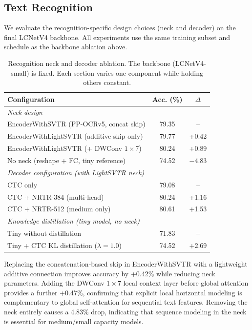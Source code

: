 \documentclass[11pt, a4paper,logo,  copyright, nonumbering]{paddleocr}
\begin{document}
\subsection{Text Recognition}
\label{sec:ablation}

We evaluate the recognition-specific design choices (neck and decoder) on the final LCNetV4 backbone. All experiments use the same training subset and schedule as the backbone ablation above.

\begin{table}[h]
\centering
\small
\begin{tabular}{lcc}
\toprule
\textbf{Configuration} & \textbf{Acc. (\%)} & \textbf{$\Delta$} \\
\midrule
\multicolumn{3}{l}{\textit{Neck design}} \\
EncoderWithSVTR (PP-OCRv5, concat skip) & 79.35 & -- \\
EncoderWithLightSVTR (additive skip only) & 79.77 & +0.42 \\
EncoderWithLightSVTR (+ DWConv $1{\times}7$) & 80.24 & +0.89 \\
No neck (reshape + FC, tiny reference) & 74.52 & $-$4.83 \\
\midrule
\multicolumn{3}{l}{\textit{Decoder configuration (with LightSVTR neck)}} \\
CTC only & 79.08 & -- \\
CTC + NRTR-384 (multi-head) & 80.24 & +1.16 \\
CTC + NRTR-512 (medium only) & 80.61 & +1.53 \\
\midrule
\multicolumn{3}{l}{\textit{Knowledge distillation (tiny model, no neck)}} \\
Tiny without distillation & 71.83 & -- \\
Tiny + CTC KL distillation ($\lambda{=}1.0$) & 74.52 & +2.69 \\
\bottomrule
\end{tabular}
\caption{Recognition neck and decoder ablation. The backbone (LCNetV4-small) is fixed. Each section varies one component while holding others constant.}
\label{tab:ablation_rec}
\end{table}

Replacing the concatenation-based skip in EncoderWithSVTR with a lightweight additive connection improves accuracy by +0.42\% while reducing neck parameters. Adding the DWConv $1{\times}7$ local context layer before global attention provides a further +0.47\%, confirming that explicit local horizontal modeling is complementary to global self-attention for sequential text features. Removing the neck entirely causes a 4.83\% drop, indicating that sequence modeling in the neck is essential for medium/small capacity models.
\end{document}
